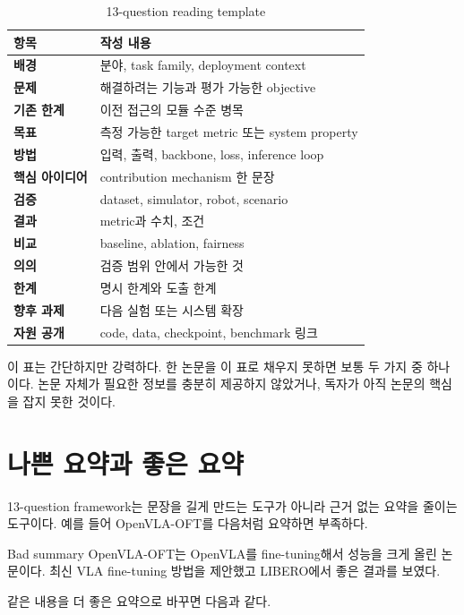 \begin{table}[t]
  \centering
  \caption{13-question reading template}
  \label{tab:thirteen_template}
  \begin{tabularx}{\textwidth}{>{\bfseries}p{25mm}X}
    \toprule
    항목 & 작성 내용 \\
    \midrule
    배경 & 분야, task family, deployment context \\
    문제 & 해결하려는 기능과 평가 가능한 objective \\
    기존 한계 & 이전 접근의 모듈 수준 병목 \\
    목표 & 측정 가능한 target metric 또는 system property \\
    방법 & 입력, 출력, backbone, loss, inference loop \\
    핵심 아이디어 & contribution mechanism 한 문장 \\
    검증 & dataset, simulator, robot, scenario \\
    결과 & metric과 수치, 조건 \\
    비교 & baseline, ablation, fairness \\
    의의 & 검증 범위 안에서 가능한 것 \\
    한계 & 명시 한계와 도출 한계 \\
    향후 과제 & 다음 실험 또는 시스템 확장 \\
    자원 공개 & code, data, checkpoint, benchmark 링크 \\
    \bottomrule
  \end{tabularx}
\end{table}

이 표는 간단하지만 강력하다. 한 논문을 이 표로 채우지 못하면 보통 두 가지 중 하나이다. 논문 자체가 필요한 정보를 충분히 제공하지 않았거나, 독자가 아직 논문의 핵심을 잡지 못한 것이다.

\section{나쁜 요약과 좋은 요약}

13-question framework는 문장을 길게 만드는 도구가 아니라 근거 없는 요약을 줄이는 도구이다. 예를 들어 OpenVLA-OFT를 다음처럼 요약하면 부족하다.

\begin{warningbox}{Bad summary}
OpenVLA-OFT는 OpenVLA를 fine-tuning해서 성능을 크게 올린 논문이다. 최신 VLA fine-tuning 방법을 제안했고 LIBERO에서 좋은 결과를 보였다.
\end{warningbox}

같은 내용을 더 좋은 요약으로 바꾸면 다음과 같다.

